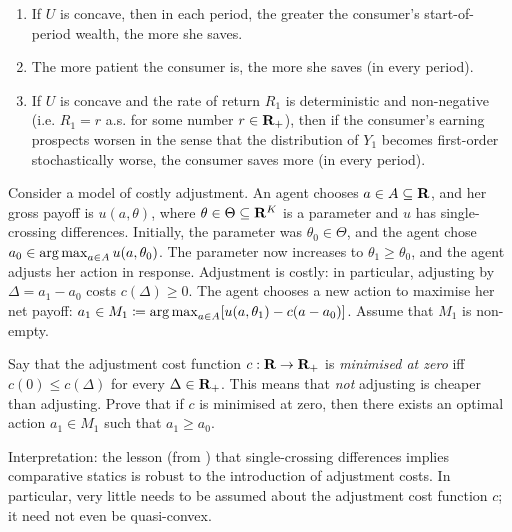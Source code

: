 \begin{exercise}
\begin{enumerate}[label=(\alph*)]
		\item If $U$ is concave, then in each period, the greater the consumer's start-of-period wealth, the more she saves.

		\item The more patient the consumer is, the more she saves (in every period).

		\item If $U$ is concave and the rate of return $R_1$ is deterministic and non-negative (i.e. $R_1=r$ a.s. for some number $r \in \mathbf{R}_+$), then if the consumer's earning prospects worsen in the sense that the distribution of $Y_1$ becomes first-order stochastically worse, the consumer saves more (in every period).
	
	\end{enumerate}
\end{exercise}

\begin{exercise}[based on \textcite{DekelQuahSinander}]
	\label{exercise:adj}
	Consider a model of costly adjustment. An agent chooses $a \in A \subseteq \mathbf{R}$, and her gross payoff is $u(a,\theta)$, where $\theta \in \Theta \subseteq \mathbf{R}^K$ is a parameter and $u$ has single-crossing differences. Initially, the parameter was $\theta_0 \in \Theta$, and the agent chose $a_0 \in \operatorname*{arg\,max}_{a \in A} u(a,\theta_0)$. The parameter now increases to $\theta_1 \geq \theta_0$, and the agent adjusts her action in response. Adjustment is costly: in particular, adjusting by $\Delta = a_1 - a_0$ costs $c(\Delta) \geq 0$.  The agent chooses a new action to maximise her net payoff: $a_1 \in M_1 \coloneqq \operatorname*{arg\,max}_{a \in A} [u(a,\theta_1)-c(a-a_0)]$. Assume that $M_1$ is non-empty.

	Say that the adjustment cost function $c : \mathbf{R} \to \mathbf{R}_+$ is \emph{minimised at zero} iff $c(0) \leq c(\Delta)$ for every $\Delta \in \mathbf{R}_+$. This means that \emph{not} adjusting is cheaper than adjusting. Prove that if $c$ is minimised at zero, then there exists an optimal action $a_1 \in M_1$ such that $a_1 \geq a_0$.

	Interpretation: the lesson (from ) that single-crossing differences implies comparative statics is robust to the introduction of adjustment costs. In particular, very little needs to be assumed about the adjustment cost function $c$; it need not even be quasi-convex.
\end{exercise}
